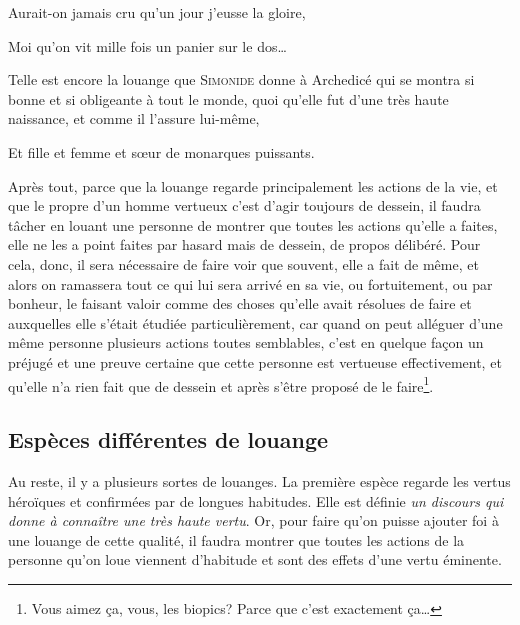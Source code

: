 \begin{emphpar}
	Aurait-on jamais cru qu'un jour j'eusse la gloire,

	Moi qu'on vit mille fois un panier sur le dos\dots
\end{emphpar}

Telle est encore la louange que \textsc{Simonide} donne à Archedicé qui se montra si bonne et si obligeante à tout le monde,
quoi qu'elle fut d'une très haute naissance, et comme il l'assure lui-même, 

\begin{emphpar}
	Et fille et femme et sœur de monarques puissants.
\end{emphpar}

Après tout, parce que la louange regarde principalement les actions de la vie, et que le propre d'un homme vertueux c'est
d'agir toujours de dessein, il faudra tâcher en louant une personne de montrer que toutes les actions qu'elle a faites,
elle ne les a point faites par hasard mais de dessein, de propos délibéré. Pour cela, donc, il sera nécessaire de faire voir
que souvent, elle a fait de même, et alors on ramassera tout ce qui lui sera arrivé en sa vie, ou fortuitement, ou par bonheur,
le faisant valoir comme des choses qu'elle avait résolues de faire et auxquelles elle s'était étudiée particulièrement, car
quand on peut alléguer d'une même personne plusieurs actions toutes semblables, c'est en quelque façon un préjugé et une preuve
certaine que cette personne est vertueuse effectivement, et qu'elle n'a rien fait que de dessein et après s'être proposé de le 
faire\footnote{Vous aimez ça, vous, les biopics? Parce que c'est exactement ça\dots}.

\subsection{Espèces différentes de louange}

Au reste, il y a plusieurs sortes de louanges. La première espèce regarde les vertus héroïques et confirmées par de
longues habitudes. Elle est définie \emph{un discours qui donne à connaître une très haute vertu}. Or, pour faire qu'on
puisse ajouter foi à une louange de cette qualité, il faudra montrer que toutes les actions de la personne qu'on loue
viennent d'habitude et sont des effets d'une vertu éminente.

\bigbreak

